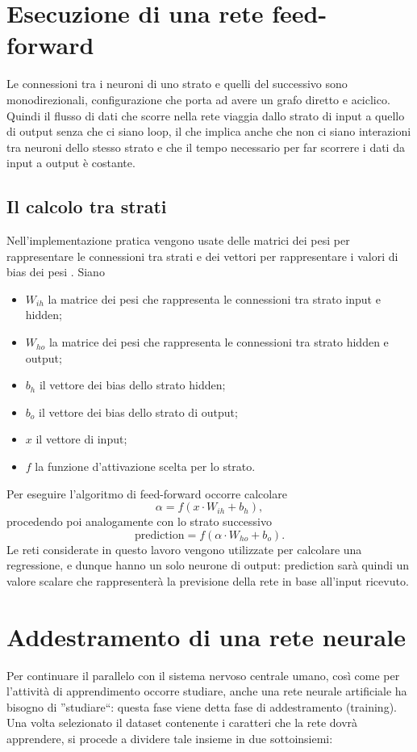 \documentclass[12pt]{report}
\begin{document}
\section{Esecuzione di una rete feed-forward}
Le connessioni tra i neuroni di uno strato e quelli del successivo sono monodirezionali, configurazione che porta ad avere un grafo diretto e aciclico. Quindi il flusso di dati che scorre nella rete viaggia dallo strato di input a quello di output senza che ci siano loop, il che implica anche che non ci siano interazioni tra neuroni dello stesso strato e che il tempo necessario per far scorrere i dati da input a output è costante.

\subsection{Il calcolo tra strati}\label{feedforward}
Nell'implementazione pratica vengono usate delle matrici dei pesi per rappresentare le connessioni tra strati e dei vettori per rappresentare i valori di bias dei pesi . 
Siano 
\begin{itemize}
\item{$W_{ih}$} la matrice dei pesi che rappresenta le connessioni tra strato input e hidden;
\item{$W_{ho}$} la matrice dei pesi che rappresenta le connessioni tra strato hidden e output;
\item{$b_h$} il vettore dei bias dello strato hidden;
\item{$b_o$} il vettore dei bias dello strato di output;
\item{$x$} il vettore di input;
\item{$f$} la funzione d'attivazione scelta per lo strato.
\end{itemize}
Per eseguire l'algoritmo di feed-forward occorre calcolare
$$\alpha = f\left(x \cdot W_{ih} + b_h\right),$$
procedendo poi analogamente con lo strato successivo
$$\mathrm{prediction} = f\left(\alpha \cdot W_{ho} + b_o\right).$$
Le reti considerate in questo lavoro vengono utilizzate per calcolare una regressione, e dunque hanno un solo neurone di output: prediction sarà quindi un valore scalare che rappresenterà la previsione della rete in base all'input ricevuto.

\section{Addestramento di una rete neurale}
Per continuare il parallelo con il sistema nervoso centrale umano, così come per l'attività di apprendimento occorre studiare, anche una rete neurale artificiale ha bisogno di ''studiare``: questa fase viene detta fase di addestramento (training).
Una volta selezionato il dataset contenente i caratteri che la rete dovrà apprendere, si procede a dividere tale insieme in due sottoinsiemi:
\end{document}
